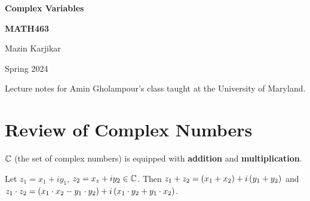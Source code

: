 \documentclass{article}
\begin{document}
  \begin{titlepage}
    \centering
    \vspace*{3cm}

    \Huge \textbf{Complex Variables} \par
    \Huge \textbf{MATH463} \par
    \vspace{1cm}
    \Huge Mazin Karjikar\par
    \vspace{1cm}
    \huge Spring 2024 \par
    \vspace{2cm}
    \Large
    Lecture notes for Amin Gholampour's class taught 
    at the University of Maryland.
    
  \end{titlepage}

  \tableofcontents

  \newpage

  \section{Review of Complex Numbers} \vspace{7mm}


  \begin{framed}\begin{spacing}{1.2}
    
    ${\mathbb C}$ (the set of complex numbers) is equipped with \textbf{addition}
    and \textbf{multiplication}. 

  Let $z_1 = x_1 + iy_1$, $z_2 = x_z + iy_2 \in {\mathbb C}$. Then \el
  $z_1 + z_2 = \left(x_1+x_2\right) + i\left(y_1+y_2\right)$ and \el
  $z_1 \cdot z_2 = \left(x_1 \cdot x_2 - y_1 \cdot y_2\right) + 
  i\left(x_1 \cdot y_2 + y_1 \cdot x_2\right)$. 
  \end{spacing}
  \end{framed} 

  
\end{document}
